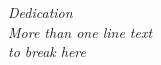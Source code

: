 \cleardoublepage
\thispagestyle{empty}
\begin{center}
\Large\itshape
Dedication\\
More than one line text\\ to break here
\end{center}
